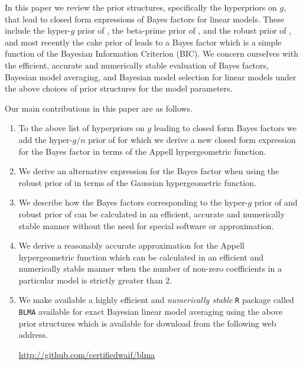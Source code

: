 \documentclass[12pt]{article}
\begin{document}
In this paper we review the prior structures, specifically the hyperpriors on $g$, 
that lead to closed form expressions of Bayes factors for linear models.
These include the hyper-$g$ prior of \cite{Liang2008}, the beta-prime prior of \cite{Maruyama2011}, and the robust 
prior of \cite{Bayarri2012}, and most recently the cake prior of \cite{OrmerodEtal2017} leads to a Bayes factor which is a simple function of the Bayesian Information Criterion (BIC). We concern ourselves with the efficient, accurate and numerically stable evaluation of Bayes factors, Bayesian model averaging,
and Bayesian model selection  for linear models 
under the above choices of prior structures for the model parameters.


Our main contributions in this paper are as follows.
\begin{enumerate}
	\item To the above list of hyperpriors on $g$ leading to closed form Bayes factors
	we add the  hyper-$g/n$ prior of \cite{Liang2008} for which we
	derive a new closed form expression for the Bayes factor in terms
	of the Appell hypergeometric function.
	
	\item We derive an alternative expression for the Bayes factor when using the
	robust prior of \cite{Bayarri2012} in terms of the Gaussian hypergeometric function.
	
	\item We describe how the  Bayes factors corresponding to the hyper-$g$ prior of \cite{Liang2008} 
	and robust prior of \cite{Bayarri2012} can be calculated in an efficient, accurate and numerically 
	stable manner without the need for special software or approximation.
	
	\item We derive a reasonably accurate approximation for the Appell hypergeometric function
	which can be calculated in an efficient and numerically 
	stable manner when the number of non-zero coefficients in a particular model is strictly greater than 2.
	
	\item We make available a highly efficient and {\it numerically stable} {\tt R}
	package called
	{\tt BLMA} available
	for exact Bayesian linear model averaging 
	using the above prior structures which is available for download from the following web address.
	\begin{center}
	\url{http://github.com/certifiedwaif/blma}
	\end{center}
\end{enumerate}
\end{document}
